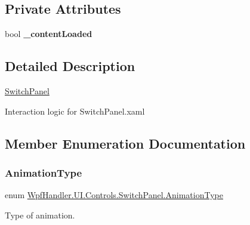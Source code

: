 \subsection*{Private Attributes}
\begin{DoxyCompactItemize}
\item 
\mbox{\label{class_wpf_handler_1_1_u_i_1_1_controls_1_1_switch_panel_a46769d162cebe1b7292ff512fe5feaf3}} 
bool {\bfseries \+\_\+content\+Loaded}
\end{DoxyCompactItemize}


\subsection{Detailed Description}
\mbox{\hyperlink{class_wpf_handler_1_1_u_i_1_1_controls_1_1_switch_panel}{Switch\+Panel}} 

Interaction logic for Switch\+Panel.\+xaml 

\subsection{Member Enumeration Documentation}
\mbox{\label{class_wpf_handler_1_1_u_i_1_1_controls_1_1_switch_panel_aad6e1d850ec0101cc8d98c259971e272}} 
\subsubsection{\texorpdfstring{Animation\+Type}{AnimationType}}
{\footnotesize\ttfamily enum \mbox{\hyperlink{class_wpf_handler_1_1_u_i_1_1_controls_1_1_switch_panel_aad6e1d850ec0101cc8d98c259971e272}{Wpf\+Handler.\+U\+I.\+Controls.\+Switch\+Panel.\+Animation\+Type}}\hspace{0.3cm}{\ttfamily [strong]}}



Type of animation. 

